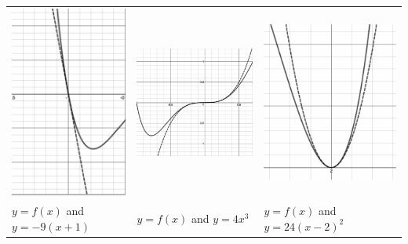 \documentclass{ximera}
\begin{document}
\begin{tabular}{m{2in}m{2in}m{2in}}

\includegraphics[height=2.in, width=2.in]{./GraphsofPolynomialsGraphics/PolyZeroEx02.jpg} 
&

\includegraphics[height=2.in, width=2.in]{./GraphsofPolynomialsGraphics/PolyZeroEx03.jpg} 

&

\includegraphics[height=2.in, width=2.in]{./GraphsofPolynomialsGraphics/PolyZeroEx04.jpg}  \\

$y = f(x)$ and $y = -9(x+1)$

&

$y = f(x)$ and $y = 4x^3$ 

&

$y = f(x)$ and $y=24(x-2)^2$ \\

\end{tabular}

\medskip
\end{document}
